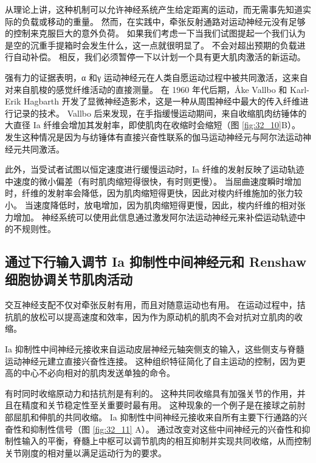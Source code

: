 从理论上讲，这种机制可以允许神经系统产生给定距离的运动，而无需事先知道实际的负载或移动的重量。 然而，在实践中，牵张反射通路对运动神经元没有足够的控制来克服巨大的意外负荷。 如果我们考虑一下当我们试图提起一个我们认为是空的沉重手提箱时会发生什么，这一点就很明显了。 不会对超出预期的负载进行自动补偿。 相反，我们必须暂停一下以计划一个具有更大肌肉激活的新运动。

强有力的证据表明，α 和γ 运动神经元在人类自愿运动过程中被共同激活，这来自对来自肌梭的感觉纤维活动的直接测量。 在 1960 年代后期，Åke Vallbo 和 Karl-Erik Hagbarth 开发了显微神经造影术，这是一种从周围神经中最大的传入纤维进行记录的技术。 Vallbo 后来发现，在手指缓慢运动期间，来自收缩肌肉纺锤体的大直径 Ia 纤维会增加其发射率，即使肌肉在收缩时会缩短（图 \ref{fig:32_10}B）。 发生这种情况是因为与纺锤体有直接兴奋性联系的伽马运动神经元与阿尔法运动神经元共同激活。

此外，当受试者试图以恒定速度进行缓慢运动时，Ia 纤维的发射反映了运动轨迹中速度的微小偏差（有时肌肉缩短得很快，有时则更慢）。 当屈曲速度瞬时增加时，纤维的发射率会降低，因为肌肉缩短得更快，因此对梭内纤维施加的张力较小。 当速度降低时，放电增加，因为肌肉缩短得更慢，因此，梭内纤维的相对张力增加。 神经系统可以使用此信息通过激发阿尔法运动神经元来补偿运动轨迹中的不规则性。

\subsection{通过下行输入调节 Ia 抑制性中间神经元和 Renshaw 细胞协调关节肌肉活动}
交互神经支配不仅对牵张反射有用，而且对随意运动也有用。 在运动过程中，拮抗肌的放松可以提高速度和效率，因为作为原动机的肌肉不会对抗对立肌肉的收缩。

Ia 抑制性中间神经元接收来自运动皮层神经元轴突侧支的输入，这些侧支与脊髓运动神经元建立直接兴奋性连接。 这种组织特征简化了自主运动的控制，因为更高的中心不必向相对的肌肉发送单独的命令。

有时同时收缩原动力和拮抗剂是有利的。 这种共同收缩具有加强关节的作用，并且在精度和关节稳定性至关重要时最有用。 这种现象的一个例子是在接球之前肘部屈肌和伸肌的共同收缩。 
Ia 抑制性中间神经元接收来自所有主要下行通路的兴奋性和抑制性信号（图 \ref{fig:32_11} A）。 
通过改变对这些中间神经元的兴奋性和抑制性输入的平衡，脊髓上中枢可以调节肌肉的相互抑制并实现共同收缩，从而控制关节刚度的相对量以满足运动行为的要求。


